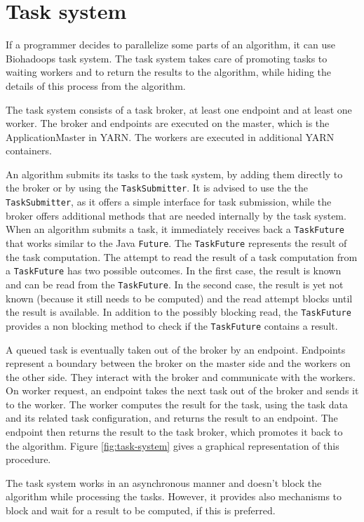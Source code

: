 \section{Task system}
\label{chap:impl:task-system}
If a programmer decides to parallelize some parts of an algorithm, it can use Biohadoops task system. The task system takes care of promoting tasks to waiting workers and to return the results to the algorithm, while hiding the details of this process from the algorithm.

The task system consists of a task broker, at least one endpoint and at least one worker. The broker and endpoints are executed on the master, which is the ApplicationMaster in YARN. The workers are executed in additional YARN containers.

An algorithm submits its tasks to the task system, by adding them directly to the broker or by using the \texttt{TaskSubmitter}. It is advised to use the the \texttt{TaskSubmitter}, as it offers a simple interface for task submission, while the broker offers additional methods that are needed internally by the task system. When an algorithm submits a task, it immediately receives back a \texttt{TaskFuture} that works similar to the Java \texttt{Future}. The \texttt{TaskFuture} represents the result of the task computation. The attempt to read the result of a task computation from a \texttt{TaskFuture} has two possible outcomes. In the first case, the result is known and can be read from the \texttt{TaskFuture}. In the second case, the result is yet not known (because it still needs to be computed) and the read attempt blocks until the result is available. In addition to the possibly blocking read, the \texttt{TaskFuture} provides a non blocking method to check if the \texttt{TaskFuture} contains a result.

A queued task is eventually taken out of the broker by an endpoint. Endpoints represent a boundary between the broker on the master side and the workers on the other side. They interact with the broker and communicate with the workers. On worker request, an endpoint takes the next task out of the broker and sends it to the worker. The worker computes the result for the task, using the task data and its related task configuration, and returns the result to an endpoint. The endpoint then returns the result to the task broker, which promotes it back to the algorithm. Figure \ref{fig:task-system} gives a graphical representation of this procedure.

The task system works in an asynchronous manner and doesn't block the algorithm while processing the tasks. However, it provides also mechanisms to block and wait for a result to be computed, if this is preferred.

